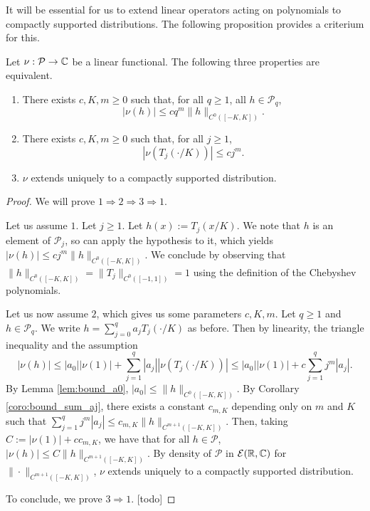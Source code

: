 It will be essential for us to extend linear operators acting on polynomials
to compactly supported distributions. The following proposition provides a criterium for this.

\begin{proposition}
  \label{prop:extension_poly_smooth}
  Let $\nu : \mathcal{P} \rightarrow \mathbb{C}$ be a linear functional.
  The following three properties are equivalent.
  \begin{enumerate}
    \item There exists $c, K, m \geq 0$ such that, for all $q \geq 1$, all
    $h \in \mathcal{P}_q$,
    \begin{equation*}
      |\nu(h)| \leq c q^m \|h\|_{C^0([-K,K])}.
    \end{equation*}
    \item There exists $c, K, m \geq 0$ such that, for all $j \geq 1$,
    \begin{equation*}
      |\nu(T_j(\cdot / K))| \leq c j^m.
    \end{equation*}
    \item $\nu$ extends uniquely to a compactly supported distribution.
  \end{enumerate}
\end{proposition}

\begin{proof}
  We will prove $1 \Rightarrow 2 \Rightarrow 3 \Rightarrow 1$.

  Let us assume $1$.
  Let $j \geq 1$.
  Let $h (x) := T_j(x/K)$.
  We note that $h$ is an element of $\mathcal{P}_j$, so can apply the
  hypothesis to it, which yields $|\nu(h)| \leq c j^m \|h\|_{C^0([-K,K])}$.
  We conclude by observing that $\|h\|_{C^0([-K,K])} = \|T_j\|_{C^0([-1,1])}=1$
  using the definition of the Chebyshev polynomials.

  Let us now assume $2$, which gives us some parameters $c, K, m$.
  Let $q \geq 1$ and $h \in \mathcal{P}_q$. We write $h = \sum_{j=0}^q a_j T_j(\cdot / K)$
  as before. Then by linearity, the triangle inequality and  the assumption
  \begin{equation*}
    |\nu(h)|
    \leq |a_0| |\nu(1)| + \sum_{j=1}^q |a_j| |\nu(T_j(\cdot / K))|
    \leq |a_0| |\nu(1)| + c \sum_{j=1}^q j^m|a_j|.
  \end{equation*}
  By Lemma \ref{lem:bound_a0}, $|a_0| \leq \|h\|_{C^0([-K,K])}$.
  By Corollary \ref{coro:bound_sum_aj}, there exists a constant $c_{m,K}$
  depending only on $m$ and $K$ such that
  $\sum_{j=1}^q j^m|a_j| \leq c_{m,K} \|h\|_{C^{m+1}([-K,K])}$.
  Then, taking $C := |\nu(1)| + c c_{m,K}$, we have that
  for all $h \in \mathcal{P}$,
  $|\nu(h)| \leq C \|h\|_{C^{m+1}([-K,K])}$.
  By density of $\mathcal{P}$ in $\mathcal{E}(\mathbb{R}, \mathbb{C})$
  for $\|\cdot \|_{C^{m+1}([-K,K])}$, $\nu$ extends uniquely to a compactly
  supported distribution.

  To conclude, we prove $3 \Rightarrow 1$. [todo]
\end{proof}

